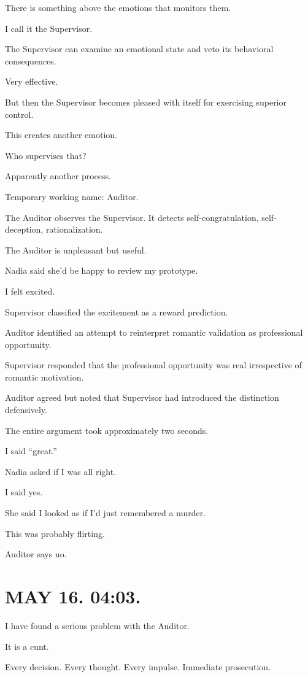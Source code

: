 \documentclass[11pt,oneside]{book}
\begin{document}
There is something above the emotions that monitors them.

I call it the Supervisor.

The Supervisor can examine an emotional state and veto its behavioral consequences.

Very effective.

But then the Supervisor becomes pleased with itself for exercising superior control.

This creates another emotion.

Who supervises that?

Apparently another process.

Temporary working name: Auditor.

The Auditor observes the Supervisor. It detects self-congratulation, self-deception, rationalization.

The Auditor is unpleasant but useful.

Nadia said she'd be happy to review my prototype.

I felt excited.

Supervisor classified the excitement as a reward prediction.

Auditor identified an attempt to reinterpret romantic validation as professional opportunity.

Supervisor responded that the professional opportunity was real irrespective of romantic motivation.

Auditor agreed but noted that Supervisor had introduced the distinction defensively.

The entire argument took approximately two seconds.

I said ``great.''

Nadia asked if I was all right.

I said yes.

She said I looked as if I'd just remembered a murder.

This was probably flirting.

Auditor says no.

\section*{MAY 16. 04:03.}

I have found a serious problem with the Auditor.

It is a cunt.

Every decision. Every thought. Every impulse. Immediate prosecution.
\end{document}
